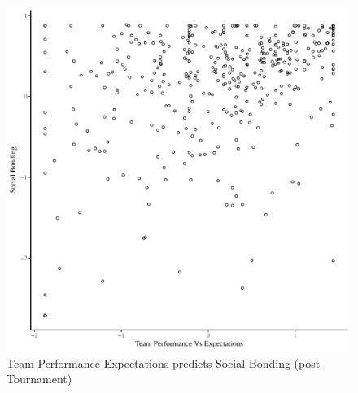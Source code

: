 \begin{CJK}{UTF8}{gbsn}
  \begin{figure}[htbp]
    \centering
  \includegraphics[scale=.5]{images/teamPerfBondOverallBasicXY.pdf}
    \caption{Team Performance Expectations predicts Social Bonding (post-Tournament)}
    \label{fig:teamPerfBondOverallBasicXY}
  \end{figure}



\end{CJK}
